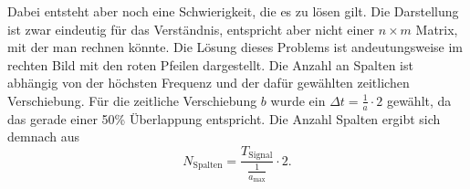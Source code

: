 Dabei entsteht aber noch eine Schwierigkeit, die es zu lösen gilt.
Die Darstellung ist zwar eindeutig für das Verständnis, entspricht
aber nicht einer $n \times m$ Matrix, mit der man rechnen könnte.
Die Lösung dieses Problems ist andeutungsweise im rechten Bild mit
den roten Pfeilen dargestellt.
Die Anzahl an Spalten ist abhängig von der höchsten Frequenz und
der dafür gewählten zeitlichen Verschiebung.
Für die zeitliche Verschiebung $b$ wurde ein $\Delta t=\frac{1}{a}\cdot2$
gewählt, da das gerade einer 50\% Überlappung entspricht.
Die Anzahl Spalten ergibt sich demnach aus
\begin{equation}
	N_\text{Spalten}=\frac{T_\text{Signal}}{\frac{1}{a_\text{max}}}\cdot2.
	\label{wavelets:equation7}
\end{equation}


